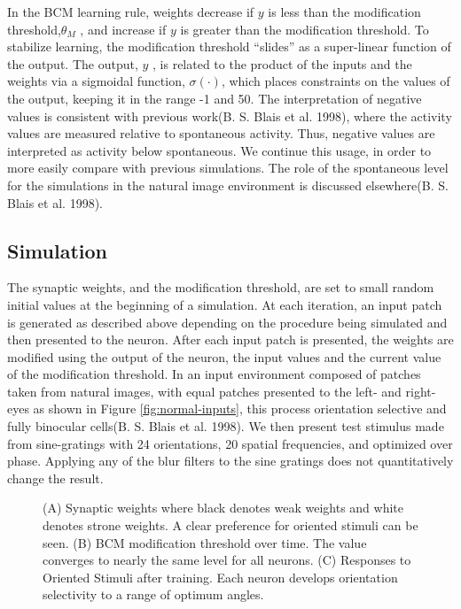\documentclass[
  sn-apa,
  pdflatex]{sn-jnl}
\theoremstyle{thmstyleone}%
\theoremstyle{thmstyletwo}%
\theoremstyle{thmstylethree}%
\begin{document}
In the BCM learning rule, weights decrease if \(y\) is less than the
modification threshold,\(\theta_M\) , and increase if \(y\) is greater
than the modification threshold. To stabilize learning, the modification
threshold ``slides'' as a super-linear function of the output. The
output, \(y\) , is related to the product of the inputs and the weights
via a sigmoidal function, \(\sigma(\cdot)\), which places constraints on
the values of the output, keeping it in the range -1 and 50. The
interpretation of negative values is consistent with previous work(B. S.
Blais et al. 1998), where the activity values are measured relative to
spontaneous activity. Thus, negative values are interpreted as activity
below spontaneous. We continue this usage, in order to more easily
compare with previous simulations. The role of the spontaneous level for
the simulations in the natural image environment is discussed
elsewhere(B. S. Blais et al. 1998).

\hypertarget{simulation}{%
\subsection{Simulation}\label{simulation}}

The synaptic weights, and the modification threshold, are set to small
random initial values at the beginning of a simulation. At each
iteration, an input patch is generated as described above depending on
the procedure being simulated and then presented to the neuron. After
each input patch is presented, the weights are modified using the output
of the neuron, the input values and the current value of the
modification threshold. In an input environment composed of patches
taken from natural images, with equal patches presented to the left- and
right-eyes as shown in Figure \ref{fig:normal-inputs}, this process
orientation selective and fully binocular cells(B. S. Blais et al.
1998). We then present test stimulus made from sine-gratings with 24
orientations, 20 spatial frequencies, and optimized over phase. Applying
any of the blur filters to the sine gratings does not quantitatively
change the result.

\begin{figure}
\hypertarget{fig:rf-theta-tuning-curve}{%
\centering

\caption{(A) Synaptic weights where black denotes weak weights and white
denotes strone weights. A clear preference for oriented stimuli can be
seen. (B) BCM modification threshold over time. The value converges to
nearly the same level for all neurons. (C) Responses to Oriented Stimuli
after training. Each neuron develops orientation selectivity to a range
of optimum angles.}\label{fig:rf-theta-tuning-curve}
}
\end{figure}
\end{document}
